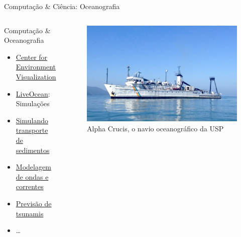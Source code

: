 \documentclass[10pt, compress, aspectratio=169, xcolor={table,usenames,dvipsnames}]{beamer}
\begin{document}
\begin{frame}[label={sec:orga105e76}]{Computação \& Ciência: Oceanografia}
\begin{columns}
\begin{column}{0.5\columnwidth}
\begin{block}{Computação \& Oceanografia}
\begin{itemize}
\item \href{http://www.cev.washington.edu/index.html}{Center for Environment Visualization}
\item \href{https://faculty.washington.edu/pmacc/LO/LiveOcean.html}{LiveOcean}: Simulações
\item \href{http://www.ncsa.illinois.edu/news/story/the\_fragile\_balance\_of\_the\_most\_productive\_ecosystems}{Simulando transporte de sedimentos}
\item \href{https://www.onepetro.org/conference-paper/ISOPE-I-02-281}{Modelagem de ondas e correntes}
\item \href{https://agupubs.onlinelibrary.wiley.com/doi/full/10.1002/2014GL062577}{Previsão de tsunamis}
\item \dots{}
\end{itemize}
\end{block}
\end{column}
\begin{column}{0.5\columnwidth}
\begin{figure}[htbp]
\centering
\includegraphics[width=\columnwidth]{../../../img/alpha_crucis.jpg}
\caption{\alert{Alpha Crucis}, o navio oceanográfico da USP}
\end{figure}
\end{column}
\end{columns}
\end{frame}
\end{document}
